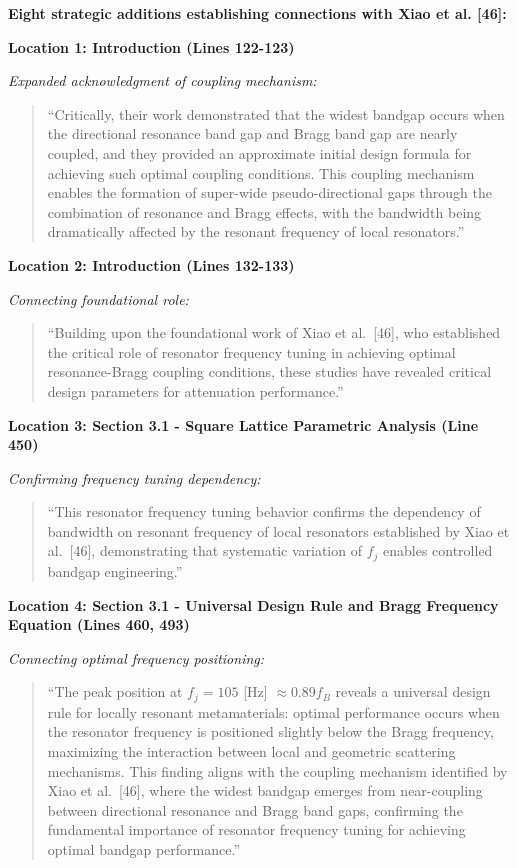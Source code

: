 \documentclass[11pt,a4paper]{article}
\newenvironment{changesbox}{%
    \par\medskip\noindent{\color{changescolor}\rule{\linewidth}{2pt}}\par
    \noindent{\color{changescolor}\bfseries Manuscript Changes}\par\smallskip
}{%
    \par\noindent{\color{changescolor}\rule{\linewidth}{0.5pt}}\medskip
}
\begin{document}
\begin{changesbox}
\textbf{Eight strategic additions establishing connections with Xiao et al. [46]:}

\textbf{Location 1: Introduction (Lines 122-123)}

\textit{Expanded acknowledgment of coupling mechanism:}
\begin{quote}
\textcolor{redtext}{``Critically, their work demonstrated that the widest bandgap occurs when the directional resonance band gap and Bragg band gap are nearly coupled, and they provided an approximate initial design formula for achieving such optimal coupling conditions. This coupling mechanism enables the formation of super-wide pseudo-directional gaps through the combination of resonance and Bragg effects, with the bandwidth being dramatically affected by the resonant frequency of local resonators.''}
\end{quote}

\textbf{Location 2: Introduction (Lines 132-133)}

\textit{Connecting foundational role:}
\begin{quote}
\textcolor{redtext}{``Building upon the foundational work of Xiao et al.~[46], who established the critical role of resonator frequency tuning in achieving optimal resonance-Bragg coupling conditions, these studies have revealed critical design parameters for attenuation performance.''}
\end{quote}

\textbf{Location 3: Section 3.1 - Square Lattice Parametric Analysis (Line 450)}

\textit{Confirming frequency tuning dependency:}
\begin{quote}
\textcolor{redtext}{``This resonator frequency tuning behavior confirms the dependency of bandwidth on resonant frequency of local resonators established by Xiao et al.~[46], demonstrating that systematic variation of $f_j$ enables controlled bandgap engineering.''}
\end{quote}

\textbf{Location 4: Section 3.1 - Universal Design Rule and Bragg Frequency Equation (Lines 460, 493)}

\textit{Connecting optimal frequency positioning:}
\begin{quote}
\textcolor{redtext}{``The peak position at $f_j = 105$ [Hz] $\approx 0.89 f_B$ reveals a universal design rule for locally resonant metamaterials: optimal performance occurs when the resonator frequency is positioned slightly below the Bragg frequency, maximizing the interaction between local and geometric scattering mechanisms. This finding aligns with the coupling mechanism identified by Xiao et al.~[46], where the widest bandgap emerges from near-coupling between directional resonance and Bragg band gaps, confirming the fundamental importance of resonator frequency tuning for achieving optimal bandgap performance.''}
\end{quote}


\end{changesbox}
\end{document}
